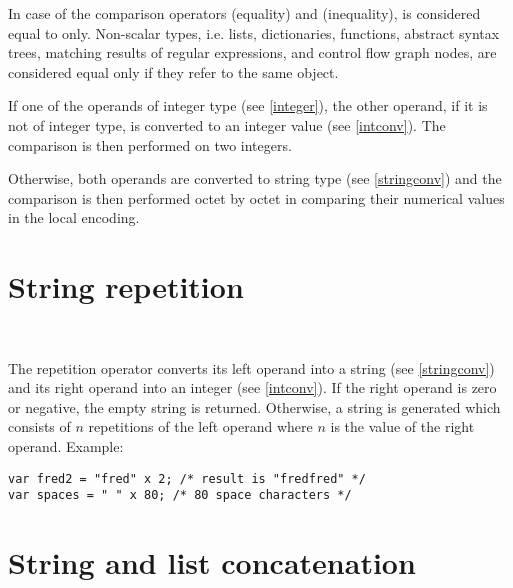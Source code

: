 \noindent
In case of the comparison operators \token{==} (equality)
and \token{!=} (inequality),  is considered equal
to  only. Non-scalar types, i.e. lists, dictionaries,
functions, abstract syntax trees, matching results of regular
expressions, and control flow graph nodes, are considered equal
only if they refer to the same object.

If one of the operands of integer type (see \ref{integer}),
the other operand, if it is not of integer type, is converted to an
integer value (see \ref{intconv}). The comparison is then performed
on two integers.

Otherwise, both operands are converted to string type (see \ref{stringconv})
and the comparison is then performed octet by octet in comparing
their numerical values in the local encoding.

\section{String repetition}

\begin{grammar}
      \produces {} \\
      \produces {}
          
\end{grammar}

\noindent
The repetition operator  converts its left operand into a string
(see \ref{stringconv}) and its right operand into an integer
(see \ref{intconv}). If the right operand is zero or negative,
the empty string is returned. Otherwise, a string is generated
which consists of $n$ repetitions of the left operand where
$n$ is the value of the right operand. Example:

\begin{lstlisting}
var fred2 = "fred" x 2; /* result is "fredfred" */
var spaces = " " x 80; /* 80 space characters */
\end{lstlisting}

\section{String and list concatenation}

\begin{grammar}
      \produces {} \\
      \produces {}
         \lextoken{\&} 
\end{grammar}

